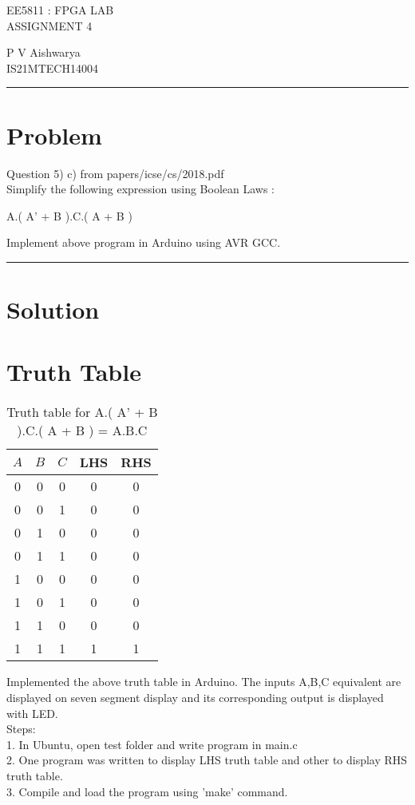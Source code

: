 \documentclass[10pt,a4paper]{article}
\begin{document}
\begin{center}

{\huge EE5811 : FPGA LAB}\\
{\large ASSIGNMENT 4}

\end{center}
P V Aishwarya \\ IS21MTECH14004

\vspace{15pt}
\hrule
\vspace{5pt}


\section*{Problem}

Question 5) c) from papers/icse/cs/2018.pdf\\
Simplify the following expression using Boolean Laws :

\begin{center}
    A.( A' + B ).C.( A + B )
\end{center}

Implement above program in Arduino using AVR GCC.

\vspace{15pt}
\hrule
\vspace{5pt}

\section*{Solution}

\section*{Truth Table}
\begin{table}[h]
    \centering
    \begin{tabular}{|c|c|c|c|c|}
        \hline
        $A$&$B$&$C$&LHS&RHS \\
        \hline
         0&0&0&0&0 \\
         0&0&1&0&0 \\
         0&1&0&0&0 \\
         0&1&1&0&0 \\
         1&0&0&0&0 \\
         1&0&1&0&0 \\
         1&1&0&0&0 \\
         1&1&1&1&1 \\
         \hline
    \end{tabular}
    \caption{Truth table for A.( A' + B ).C.( A + B ) = A.B.C}
    \label{tab:my_label}
\end{table}

Implemented the above truth table in Arduino. The inputs A,B,C equivalent are displayed on seven segment display and its corresponding output is displayed with LED.\\
Steps: \\
1. In Ubuntu, open test folder and write program in main.c\\
2. One program was written to display LHS truth table and other to display RHS truth table.\\
3. Compile and load the program using 'make' command.\\
\end{document}
